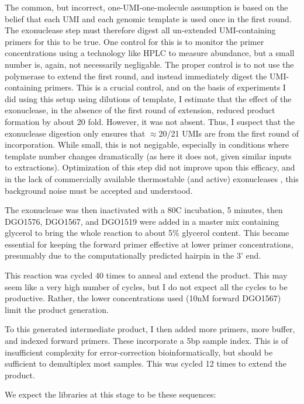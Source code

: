 The common, but incorrect, one-UMI-one-molecule assumption is based on
the belief that each UMI and each genomic template is used once in the
first round. The exonuclease step must therefore digest all
un-extended UMI-containing primers for this to be true. One control
for this is to monitor the primer concentrations using a technology
like HPLC to measure abundance, but a small number is, again, not
necessarily negligable. The proper control is to not use the
polymerase to extend the first round, and instead immediately digest
the UMI-containing primers. This is a crucial control, and on the
basis of experiments I did using this setup using dilutions of
template, I estimate that the effect of the exonuclease, in the 
absence of the first round of extension, reduced product formation 
by about 20 fold. However, it was not absent. Thus, I suspect that 
the exonuclease digestion only ensures that $\approx$20/21 UMIs are
from the first round of incorporation. While small, this is not
negigable, especially in conditions where template number changes
dramatically (as here it does not, given similar inputs to extractions).
Optimization of this step did not improve upon this efficacy, and in
the lack of commercially available thermostable (and active) 
exonucleases \parencite{fei2015structural}, this background noise 
must be accepted and understood.

The exonuclease was then inactivated with a 80C incubation, 5 minutes,
then DGO1576, DGO1567, and DGO1519 were added in a master mix
containing glycerol to bring the whole reaction to about 5\% glycerol
content. This became essential for keeping the forward primer
effective at lower primer concentrations, presumably due to the
computationally predicted hairpin in the 3' end.

This reaction was cycled 40 times to anneal and extend the product.
This may seem like a very high number of cycles, but I do not expect
all the cycles to be productive. Rather, the lower concentrations used
(10nM forward DGO1567) limit the product generation.

To this generated intermediate product, I then added more primers,
more buffer, and indexed forward primers. These incorporate a 5bp
sample index. This is of insufficient complexity for error-correction
bioinformatically, but should be sufficient to demultiplex most
samples. This was cycled 12 times to extend the product.

We expect the libraries at this stage to be these sequences:

